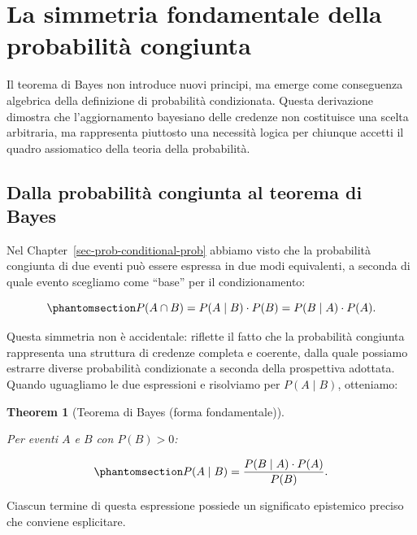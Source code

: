 \documentclass[
  letterpaper,
  DIV=11,
  numbers=noendperiod,
  oneside]{scrreprt}
\theoremstyle{definition}
\theoremstyle{plain}
\newtheorem{theorem}{Theorem}[chapter]
\theoremstyle{definition}
\theoremstyle{remark}
\begin{document}
\section{La simmetria fondamentale della probabilità
congiunta}\label{la-simmetria-fondamentale-della-probabilituxe0-congiunta}

Il teorema di Bayes non introduce nuovi principi, ma emerge come
conseguenza algebrica della definizione di probabilità condizionata.
Questa derivazione dimostra che l'aggiornamento bayesiano delle credenze
non costituisce una scelta arbitraria, ma rappresenta piuttosto una
necessità logica per chiunque accetti il quadro assiomatico della teoria
della probabilità.

\subsection{Dalla probabilità congiunta al teorema di
Bayes}\label{dalla-probabilituxe0-congiunta-al-teorema-di-bayes}

Nel Chapter~\ref{sec-prob-conditional-prob} abbiamo visto che la
probabilità congiunta di due eventi può essere espressa in due modi
equivalenti, a seconda di quale evento scegliamo come ``base'' per il
condizionamento:

\begin{equation}\phantomsection\label{eq-joint-symmetry}{
P(A \cap B) = P(A \mid B) \cdot P(B) = P(B \mid A) \cdot P(A).
}\end{equation}

Questa simmetria non è accidentale: riflette il fatto che la probabilità
congiunta rappresenta una struttura di credenze completa e coerente,
dalla quale possiamo estrarre diverse probabilità condizionate a seconda
della prospettiva adottata. Quando uguagliamo le due espressioni e
risolviamo per \(P(A \mid B)\), otteniamo:

\begin{theorem}[Teorema di Bayes (forma
fondamentale)]\protect\hypertarget{thm-bayes-theorem}{}\label{thm-bayes-theorem}

Per eventi \(A\) e \(B\) con \(P(B) > 0\):

\begin{equation}\phantomsection\label{eq-bayes-basic}{
P(A \mid B) = \frac{P(B \mid A) \cdot P(A)}{P(B)}.
}\end{equation}

\end{theorem}

Ciascun termine di questa espressione possiede un significato epistemico
preciso che conviene esplicitare.
\end{document}
